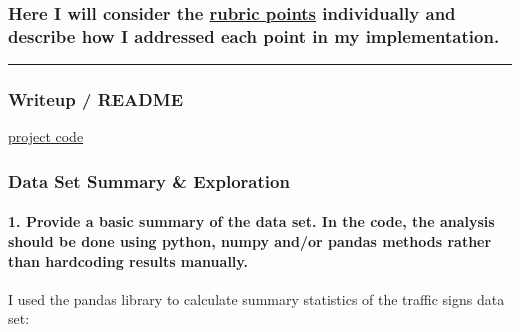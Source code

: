 \documentclass[11pt]{article}
\begin{document}
\hypertarget{here-i-will-consider-the-rubric-points-individually-and-describe-how-i-addressed-each-point-in-my-implementation.}{%
\subsubsection{\texorpdfstring{Here I will consider the
\href{https://review.udacity.com/\#!/rubrics/481/view}{rubric points}
individually and describe how I addressed each point in my
implementation.}{Here I will consider the rubric points individually and describe how I addressed each point in my implementation.}}\label{here-i-will-consider-the-rubric-points-individually-and-describe-how-i-addressed-each-point-in-my-implementation.}}

\begin{center}\rule{0.5\linewidth}{\linethickness}\end{center}

\hypertarget{writeup-readme}{%
\subsubsection{Writeup / README}\label{writeup-readme}}

\href{https://github.com/udacity/CarND-Traffic-Sign-Classifier-Project/blob/master/Traffic_Sign_Classifier.ipynb}{project
code}

\hypertarget{data-set-summary-exploration}{%
\subsubsection{Data Set Summary \&
Exploration}\label{data-set-summary-exploration}}

\hypertarget{provide-a-basic-summary-of-the-data-set.-in-the-code-the-analysis-should-be-done-using-python-numpy-andor-pandas-methods-rather-than-hardcoding-results-manually.}{%
\paragraph{1. Provide a basic summary of the data set. In the code, the
analysis should be done using python, numpy and/or pandas methods rather
than hardcoding results
manually.}\label{provide-a-basic-summary-of-the-data-set.-in-the-code-the-analysis-should-be-done-using-python-numpy-andor-pandas-methods-rather-than-hardcoding-results-manually.}}

I used the pandas library to calculate summary statistics of the traffic
signs data set:
\end{document}
